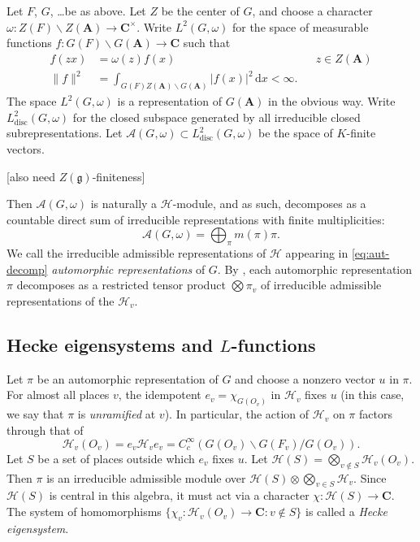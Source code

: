 \documentclass[11pt]{article}
\newcommand{\cA}{\mathcal{A}}
\newcommand{\dA}{\mathbf{A}}
\newcommand{\dC}{\mathbf{C}}
\newcommand{\fg}{\mathfrak{g}}
\newcommand{\dd}{\mathrm{d}}
\newcommand{\discrete}{\mathrm{disc}}
\newcommand{\hecke}{\mathcal{H}}
\begin{document}
Let $F$, $G$, \ldots be as above. Let $Z$ be the center of $G$, and choose a 
character $\omega:Z(F)\backslash Z(\dA)\to \dC^\times$. Write 
$L^2(G,\omega)$ for the space of measurable functions 
$f:G(F)\backslash G(\dA)\to \dC$ such that 
\begin{align*}
  f(z x) &= \omega(z) f(x) && z\in Z(\dA) \\
  \|f\|^2 &= \int_{G(F)Z(\dA)\backslash G(\dA)} |f(x)|^2\, \dd x < \infty .
\end{align*}
The space $L^2(G,\omega)$ is a representation of $G(\dA)$ in the obvious 
way. Write $L_\discrete^2(G,\omega)$ for the closed subspace generated by all 
irreducible closed subrepresentations. Let 
$\cA(G,\omega)\subset L_\discrete^2(G,\omega)$ be the space of $K$-finite 
vectors. 

[also need $Z(\fg)$-finiteness]

Then $\cA(G,\omega)$ is naturally a $\hecke$-module, and as such, 
decomposes as a countable direct sum of irreducible representations with finite 
multiplicities: 
\begin{equation}\label{eq:aut-decomp}
  \cA(G,\omega) = \bigoplus_\pi m(\pi) \pi .
\end{equation}
We call the irreducible admissible representations of $\hecke$ appearing in 
\eqref{eq:aut-decomp} \emph{automorphic representations} of $G$. By 
\cite[th.4]{f79}, each automorphic representation $\pi$ decomposes as a 
restricted tensor product $\bigotimes \pi_v$ of irreducible admissible 
representations of the $\hecke_v$. 


\subsection{Hecke eigensystems and \texorpdfstring{$L$}{L}-functions}

Let $\pi$ be an automorphic representation of $G$ and choose a nonzero vector 
$u$ in $\pi$. For almost all places $v$, the idempotent $e_v=\chi_{G(O_v)}$ in 
$\hecke_v$ fixes $u$ (in this case, we say that $\pi$ is \emph{unramified} at 
$v$). In particular, the action of $\hecke_v$ on $\pi$ factors 
through that of 
\[
  \hecke_v(O_v) = e_v \hecke_v e_v = C_c^\infty(G(O_v)\backslash G(F_v)/G(O_v)) .
\]
Let $S$ be a set of places outside which $e_v$ fixes $u$. Let 
$\hecke(S)=\bigotimes_{v\notin S} \hecke_v(O_v)$. Then $\pi$ is an irreducible 
admissible module over $\hecke(S)\otimes \bigotimes_{v\in S} \hecke_v$. Since 
$\hecke(S)$ is central in this algebra, it must act via a character 
$\chi:\hecke(S)\to \dC$. The system of homomorphisms 
$\{\chi_v:\hecke_v(O_v) \to \dC:v\notin S\}$ is called a \emph{Hecke 
eigensystem}. 
\end{document}
